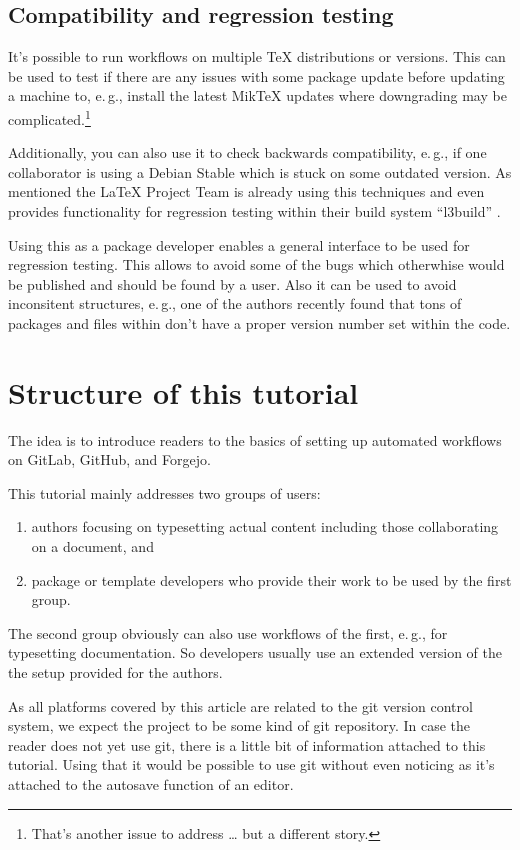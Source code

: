 \documentclass[final]{ltugboat}
\newcommand*{\TeXLive}{\acro{\TeX\,Live}}
\begin{document}
\subsection{Compatibility and regression testing}
It's possible to run workflows on multiple TeX distributions or versions.
This can be used to test if there are any issues with some package update before updating a machine to, e.\,g., install the latest MikTeX updates where downgrading may be complicated.\footnote{That's another issue to address … but a different story.}

Additionally, you can also use it to check backwards compatibility, e.\,g., if one collaborator is using a Debian Stable which is stuck on some outdated version.
As mentioned the \LaTeX{} Project Team is already using this techniques and even provides functionality for regression testing within their build system \enquote{l3build} \cite{l3build}.

Using this as a package developer enables a general interface to be used for regression testing.
This allows to avoid some of the bugs which otherwhise would be published and should be found by a user.
Also it can be used to avoid inconsitent structures, e.\,g., one of the authors recently found that tons of packages and files within \TeXLive{} don't have a proper version number set within the code.

\section{Structure of this tutorial}

The idea is to introduce readers to the basics of setting up automated workflows on GitLab, GitHub, and Forgejo.

This tutorial mainly addresses two groups of users:

\begin{enumerate}
\item authors focusing on typesetting actual content including those collaborating on a document, and
\item package or template developers who provide their work to be used by the first group.
\end{enumerate}

The second group obviously can also  use workflows of the first, e.\,g., for typesetting documentation.
So developers usually use an extended version of the the setup provided for the authors.

As all platforms covered by this article are related to the git version control system, we expect the project to be some kind of git repository.
In case the reader does not yet use git, there is a little bit of information attached to this tutorial.
Using that it would be possible to use git without even noticing as it's attached to the autosave function of an editor.
\end{document}
